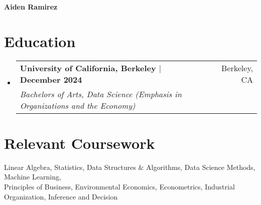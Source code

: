 \documentclass[a4paper,12pt]{article}
\makeatletter
\newcommand{\resumeSubheading}[4]{
  \item[]
    \begin{tabular*}{\textwidth}{l@{\extracolsep{\fill}}r}
      \textbf{#1} & #2 \\
      \textit{#3} & \textit{#4} \\
    \end{tabular*}
}
\newcommand{\resumeSubHeadingListStart}{\begin{itemize}[leftmargin=0in]}
\newcommand{\resumeSubHeadingListEnd}{\end{itemize}}
\makeatother
\begin{document}
\begin{center}
  \textbf{{\huge Aiden Ramirez}}\\
\end{center}

\noindent{}

\vspace{0.1cm}

\section{Education}
\resumeSubHeadingListStart
\vspace{0.2cm}
    \resumeSubheading
    {University of California, Berkeley \textnormal{$\vert$ December 2024}}{Berkeley, CA}
    {Bachelors of Arts, Data Science (Emphasis in Organizations and the Economy)}{}
\resumeSubHeadingListEnd

\section{Relevant Coursework}
\vspace{0.2cm}
Linear Algebra, Statistics, Data Structures \& Algorithms, Data Science Methods, Machine Learning,\\
Principles of Business, Environmental Economics, Econometrics, Industrial Organization, Inference and Decision

\vspace{0.15cm}
\end{document}
